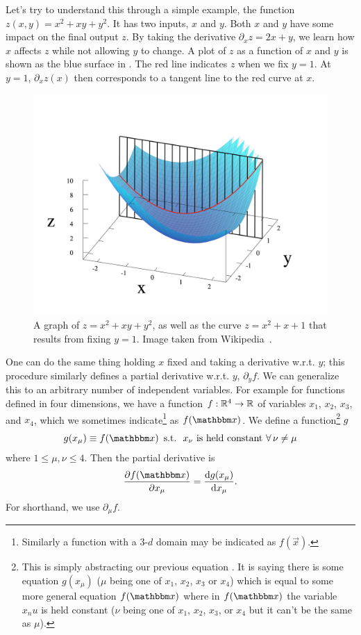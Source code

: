 Let's try to understand this through a simple example, 
the function $z(x,y)=x^{2}+xy+y^{2}$. It has two inputs, $x$ and $y$. Both $x$ and
$y$ have some impact on the final output $z$. By taking the derivative
$\partial_x z=2x+y$, we learn how $x$
affects $z$ while not allowing $y$ to change.
A plot of $z$ as a function of $x$ and $y$
is shown as the blue surface in .
The red line indicates $z$ when we fix $y=1$. At $y=1$,
$\partial_x z(x)$ then corresponds to a tangent line to
the red curve at $x$.

\begin{figure}
  \centering
  \includegraphics[width=\linewidth]{figs/Partial_func_eg.png}
  \caption{A graph of $z = x^2 + xy + y^2$, as well as the curve
  $z=x^2+x+1$ that results from fixing $y=1$.
  Image taken from Wikipedia~\cite{wiki:partial_derivative}.}
  \label{fig:partial_derivative}
\end{figure}

One can do the same thing holding $x$ fixed and taking a derivative
w.r.t. $y$; this procedure similarly defines a partial derivative w.r.t. 
$y$, $\partial_y f$.
We can generalize this to an arbitrary number of independent variables. 
For example for functions defined in four dimensions, we have a
function $f:\mathbb{R}^4\to\mathbb{R}$ of variables $x_1$, $x_2$, $x_3$, and $x_4$, which we
sometimes indicate\footnote{Similarly a function with a 3-$d$
domain may be indicated as $f(\vec{x})$.} as $f(\fvec{x})$. We define a 
function\footnote{This is simply abstracting our previous equation
. It is saying there is some
equation $g(x_\mu)$ ($\mu$ being one of $x_1$, $x_2$, $x_3$ or $x_4$) which is
equal to some more general equation $f(\fvec{x})$ where in $f(\fvec{x})$ the
variable $x_nu$ is held constant ($\nu$ being one of $x_1$, $x_2$, $x_3$, or
$x_4$ but it can't be the same as $\mu$).}
$g$
\begin{equation}
g(x_\mu)\equiv f(\fvec{x})\,
\suchthat\text{ $x_\nu$ is held constant $\Forall \nu\neq \mu$}
\end{equation}
where $1\leq\mu,\nu\leq4$. 
Then the partial derivative is
\begin{equation}
\pdv{f(\fvec{x})}{x_\mu}=\frac{\dd g(x_\mu)}{\dd x_\mu}.
\end{equation}
For shorthand, we use $\partial_\mu f$.

